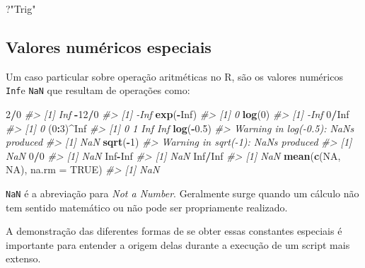 \documentclass[]{book}
\newenvironment{Shaded}{\begin{snugshade}}{\end{snugshade}}
\newcommand{\KeywordTok}[1]{\textcolor[rgb]{0.13,0.29,0.53}{\textbf{#1}}}
\newcommand{\DataTypeTok}[1]{\textcolor[rgb]{0.13,0.29,0.53}{#1}}
\newcommand{\DecValTok}[1]{\textcolor[rgb]{0.00,0.00,0.81}{#1}}
\newcommand{\FloatTok}[1]{\textcolor[rgb]{0.00,0.00,0.81}{#1}}
\newcommand{\StringTok}[1]{\textcolor[rgb]{0.31,0.60,0.02}{#1}}
\newcommand{\CommentTok}[1]{\textcolor[rgb]{0.56,0.35,0.01}{\textit{#1}}}
\newcommand{\OtherTok}[1]{\textcolor[rgb]{0.56,0.35,0.01}{#1}}
\newcommand{\OperatorTok}[1]{\textcolor[rgb]{0.81,0.36,0.00}{\textbf{#1}}}
\newcommand{\NormalTok}[1]{#1}
\begin{document}
\begin{Shaded}
\begin{Highlighting}[]
\NormalTok{?}\StringTok{"Trig"}
\end{Highlighting}
\end{Shaded}

\subsection{Valores numéricos
especiais}\label{valores-numericos-especiais}

Um caso particular sobre operação aritméticas no R, são os valores
numéricos \texttt{Inf}e \texttt{NaN} que resultam de operações como:

\begin{Shaded}
\begin{Highlighting}[]
\DecValTok{2}\OperatorTok{/}\DecValTok{0}
\CommentTok{#> [1] Inf}
\OperatorTok{-}\DecValTok{12}\OperatorTok{/}\DecValTok{0}
\CommentTok{#> [1] -Inf}
\KeywordTok{exp}\NormalTok{(}\OperatorTok{-}\OtherTok{Inf}\NormalTok{)}
\CommentTok{#> [1] 0}
\KeywordTok{log}\NormalTok{(}\DecValTok{0}\NormalTok{)}
\CommentTok{#> [1] -Inf}
\DecValTok{0}\OperatorTok{/}\OtherTok{Inf}
\CommentTok{#> [1] 0}
\NormalTok{(}\DecValTok{0}\OperatorTok{:}\DecValTok{3}\NormalTok{)}\OperatorTok{^}\OtherTok{Inf}
\CommentTok{#> [1]   0   1 Inf Inf}
\KeywordTok{log}\NormalTok{(}\OperatorTok{-}\FloatTok{0.5}\NormalTok{)}
\CommentTok{#> Warning in log(-0.5): NaNs produced}
\CommentTok{#> [1] NaN}
\KeywordTok{sqrt}\NormalTok{(}\OperatorTok{-}\DecValTok{1}\NormalTok{)}
\CommentTok{#> Warning in sqrt(-1): NaNs produced}
\CommentTok{#> [1] NaN}
\DecValTok{0}\OperatorTok{/}\DecValTok{0} 
\CommentTok{#> [1] NaN}
\OtherTok{Inf}\OperatorTok{-}\OtherTok{Inf}
\CommentTok{#> [1] NaN}
\OtherTok{Inf}\OperatorTok{/}\OtherTok{Inf}
\CommentTok{#> [1] NaN}
\KeywordTok{mean}\NormalTok{(}\KeywordTok{c}\NormalTok{(}\OtherTok{NA}\NormalTok{, }\OtherTok{NA}\NormalTok{), }\DataTypeTok{na.rm =} \OtherTok{TRUE}\NormalTok{)}
\CommentTok{#> [1] NaN}
\end{Highlighting}
\end{Shaded}

\texttt{NaN} é a abreviação para \emph{Not a Number}. Geralmente surge
quando um cálculo não tem sentido matemático ou não pode ser
propriamente realizado.

A demonstração das diferentes formas de se obter essas constantes
especiais é importante para entender a origem delas durante a execução
de um script mais extenso.
\end{document}
